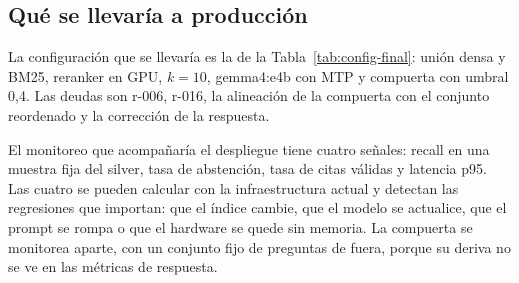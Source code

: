 \subsection{Qu\'e se llevar\'ia a producci\'on}

La configuraci\'on que se llevar\'ia es la de la Tabla~\ref{tab:config-final}: uni\'on densa y BM25, reranker en GPU, $k=10$, gemma4:e4b con MTP y compuerta con umbral 0,4. Las deudas son r-006, r-016, la alineaci\'on de la compuerta con el conjunto reordenado y la correcci\'on de la respuesta.

El monitoreo que acompa\~nar\'ia el despliegue tiene cuatro se\~nales: recall en una muestra fija del silver, tasa de abstenci\'on, tasa de citas v\'alidas y latencia p95. Las cuatro se pueden calcular con la infraestructura actual y detectan las regresiones que importan: que el \'indice cambie, que el modelo se actualice, que el prompt se rompa o que el hardware se quede sin memoria. La compuerta se monitorea aparte, con un conjunto fijo de preguntas de fuera, porque su deriva no se ve en las m\'etricas de respuesta.
